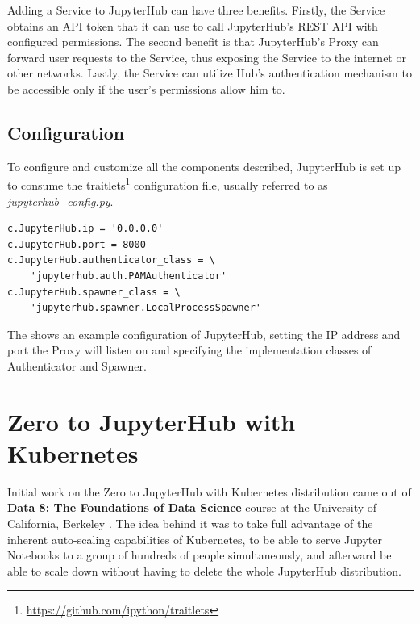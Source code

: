 \documentclass[
  digital,     %
  oneside,     %
  nosansbold,  %
  nocolorbold, %
  lof,         %
  lot,         %
]{fithesis4}
\newenvironment{code}{\captionsetup{type=listing}}{}
\begin{document}
Adding a Service to JupyterHub can have three benefits. Firstly, the Service obtains an API token that it can use to call JupyterHub's REST API with configured permissions. The second benefit is that JupyterHub's Proxy can forward user requests to the Service, thus exposing the Service to the internet or other networks. Lastly, the Service can utilize Hub's authentication mechanism to be accessible only if the user's permissions allow him to.

\subsection{Configuration}
\label{subsec:jupyterhub:configuration}

To configure and customize all the components described, JupyterHub is set up to consume the traitlets\footnote{\url{https://github.com/ipython/traitlets}} configuration file, usually referred to as \emph{jupyterhub\_config.py}.

\begin{code}
\label{lst:jupyterhub:config}
\begin{verbatim}
c.JupyterHub.ip = '0.0.0.0'
c.JupyterHub.port = 8000 
c.JupyterHub.authenticator_class = \ 
    'jupyterhub.auth.PAMAuthenticator'
c.JupyterHub.spawner_class = \
    'jupyterhub.spawner.LocalProcessSpawner'
\end{verbatim}
\end{code}

The  shows an example configuration of JupyterHub, setting the IP address and port the Proxy will listen on and specifying the implementation classes of Authenticator and Spawner.

\section{Zero to JupyterHub with Kubernetes}
\label{sec:z2jh}

Initial work on the Zero to JupyterHub with Kubernetes distribution came out of \textbf{Data 8: The Foundations of Data Science
} course at the University of California, Berkeley \cite{z2jh_uc_berkeley}. The idea behind it was to take full advantage of the inherent auto-scaling capabilities of Kubernetes, to be able to serve Jupyter Notebooks to a group of hundreds of people simultaneously, and afterward be able to scale down without having to delete the whole JupyterHub distribution.
\end{document}
